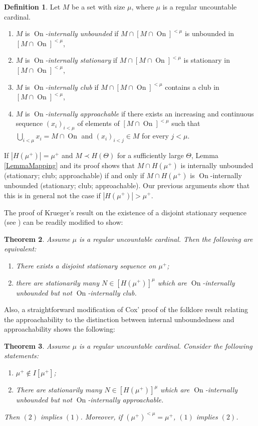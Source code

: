 \documentclass[a4paper]{amsart}
\theoremstyle{definition}
\newtheorem{mydef}{Definition}[section]
\theoremstyle{remark}
\theoremstyle{plain}
\newtheorem{mysen}[mydef]{Theorem}
\numberwithin{mydef}{section}
\DeclareMathOperator{\On}{On}
\begin{document}
	\begin{mydef}
		Let $M$ be a set with size $\mu$, where $\mu$ is a regular uncountable cardinal.
		\begin{enumerate}
			\item $M$ is \emph{$\On$-internally unbounded} if $M\cap[M\cap\On]^{<\mu}$ is unbounded in $[M\cap\On]^{<\mu}$,
			\item $M$ is \emph{$\On$-internally stationary} if $M\cap[M\cap\On]^{<\mu}$ is stationary in $[M\cap\On]^{<\mu}$,
			\item $M$ is \emph{$\On$-internally club} if $M\cap[M\cap\On]^{<\mu}$ contains a club in $[M\cap\On]^{<\mu}$,
			\item $M$ is \emph{$\On$-internally approachable} if there exists an increasing and continuous sequence $(x_i)_{i<\mu}$ of elements of $[M\cap\On]^{<\mu}$ such that $\bigcup_{i<\mu}x_i=M\cap\On$ and $(x_i)_{i<j}\in M$ for every $j<\mu$.
		\end{enumerate}
	\end{mydef}
	
	If $|H(\mu^+)|=\mu^+$ and $M\prec H(\Theta)$ for a sufficiently large $\Theta$, Lemma \ref{LemmaMapping} and its proof shows that $M\cap H(\mu^+)$ is internally unbounded (stationary; club; approachable) if and only if $M\cap H(\mu^+)$ is $\On$-internally unbounded (stationary; club; approachable). Our previous arguments show that this is in general not the case if $|H(\mu^+)|>\mu^+$.
	
	The proof of Krueger's result on the existence of a disjoint stationary sequence (see \cite[Theorem 6.5]{KruegerApplicMSI}) can be readily modified to show:
	
	\begin{mysen}
		Assume $\mu$ is a regular uncountable cardinal. Then the following are equivalent:
		\begin{enumerate}
			\item There exists a disjoint stationary sequence on $\mu^+$;
			\item there are stationarily many $N\in[H(\mu^+)]^{\mu}$ which are $\On$-internally unbounded but not $\On$-internally club.
		\end{enumerate}
	\end{mysen}
	
	Also, a straightforward modification of Cox' proof of the folklore result relating the approachability to the distinction between internal unboundedness and approachability shows the following:
	
	\begin{mysen}
		Assume $\mu$ is a regular uncountable cardinal. Consider the following statements:
		\begin{enumerate}
			\item $\mu^+\notin I[\mu^+]$;
			\item There are stationarily many $N\in[H(\mu^+)]^{\mu}$ which are $\On$-internally unbounded but not $\On$-internally approachable.
		\end{enumerate}
		Then $(2)$ implies $(1)$. Moreover, if $(\mu^+)^{<\mu}=\mu^+$, $(1)$ implies $(2)$.
	\end{mysen}
	
\end{document}
